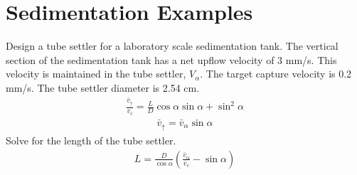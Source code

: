 \documentclass[letterpaper,10pt,english]{sphinxmanual}
\begin{document}
\chapter{Sedimentation Examples}
\label{\detokenize{Sedimentation/Sed_Examples:sedimentation-examples}}\label{\detokenize{Sedimentation/Sed_Examples:id1}}\label{\detokenize{Sedimentation/Sed_Examples::doc}}
Design a tube settler for a laboratory scale sedimentation tank. The vertical section of the sedimentation tank has a net upflow velocity of 3 mm/s. This velocity is maintained in the tube settler, \(V_\alpha\). The target capture velocity is 0.2 mm/s. The tube settler diameter is 2.54 cm.
\begin{equation}\label{equation:Sedimentation/Sed_Examples:Sedimentation/Sed_Examples:0}
\begin{split}\frac{\bar v_{\uparrow}}{v_c} = \frac{L}{D} \cos \alpha \sin \alpha + \sin ^2 \alpha\end{split}
\end{equation}\begin{equation}\label{equation:Sedimentation/Sed_Examples:Sedimentation/Sed_Examples:1}
\begin{split}\bar v_\uparrow = \bar v_\alpha\sin \alpha\end{split}
\end{equation}
Solve for the length of the tube settler.
\begin{equation}\label{equation:Sedimentation/Sed_Examples:Sedimentation/Sed_Examples:2}
\begin{split}L = \frac{D}{\cos \alpha}\left(\frac{\bar v_\alpha}{\bar v_c} - \sin \alpha\right)\end{split}
\end{equation}
%
\end{document}
